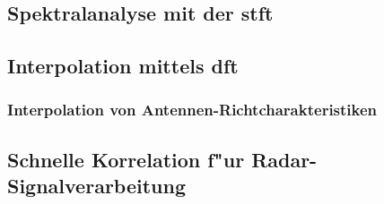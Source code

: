 \subsection{Spektralanalyse mit der \texorpdfstring{\acrlong*{stft}}{STFT}}\label{sec:stft}
%

%
\subsection{Interpolation mittels \texorpdfstring{\acrshort*{dft}}{DFT}}\label{sec:dftintp}
%

%
\subsubsection{Interpolation von Antennen-Richtcharakteristiken}\label{sec:eadf}
%

%
\ENDDOCUMENT
%
\subsection{Schnelle Korrelation f"ur Radar-Signalverarbeitung}\label{sec:mseq}
%
